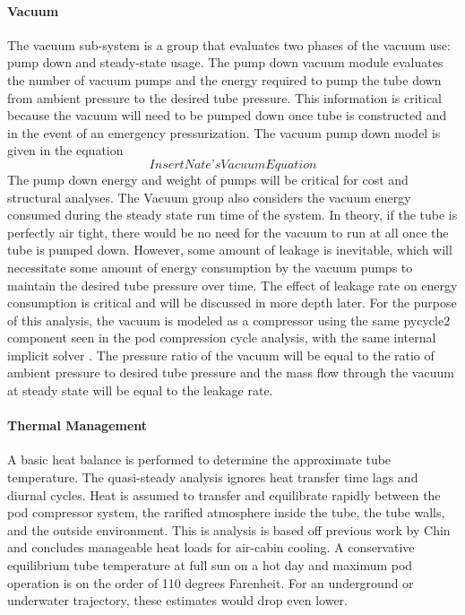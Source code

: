 \paragraph{Vacuum}
	The vacuum sub-system is a group that evaluates two phases of the vacuum use: pump down and steady-state usage. The pump down vacuum module evaluates the number of vacuum pumps and the energy required to pump the tube down from ambient pressure to the desired tube pressure. This information is critical because the vacuum will need to be pumped down once tube is constructed and in the event of an emergency pressurization. The vacuum pump down model is given in the equation
	\begin{equation}
		\label{eq:vacuum}
		Insert Nate’s Vacuum Equation
	\end{equation}
	The pump down energy and weight of pumps will be critical for cost and structural analyses.
	The Vacuum group also considers the vacuum energy consumed during the steady state run time of the system. In theory, if the tube is perfectly air tight, there would be no need for the vacuum to run at all once the tube is pumped down. However, some amount of leakage is inevitable, which will necessitate some amount of energy consumption by the vacuum pumps to maintain the desired tube pressure over time. The effect of leakage rate on energy consumption is critical and will be discussed in more depth later. For the purpose of this analysis, the vacuum is modeled as a compressor using the same pycycle2 component seen in the pod compression cycle analysis, with the same internal implicit solver \cite{pycycle2}. The pressure ratio of the vacuum will be equal to the ratio of ambient pressure to desired tube pressure and the mass flow through the vacuum at steady state will be equal to the leakage rate.
\paragraph{Thermal Management}
	A basic heat balance is performed to determine the approximate tube temperature. The quasi-steady analysis ignores heat transfer time lags and diurnal cycles. Heat is assumed to transfer and equilibrate rapidly between the pod compressor system, the rarified atmosphere inside the tube, the tube walls, and the outside environment. This is analysis is based off previous work by Chin\cite{Chin} and concludes
	manageable heat loads for air-cabin cooling. A conservative equilibrium tube temperature at full sun on a hot day and maximum pod operation is on the order of 110 degrees Farenheit.
	For an underground or underwater trajectory, these estimates would drop even lower.
